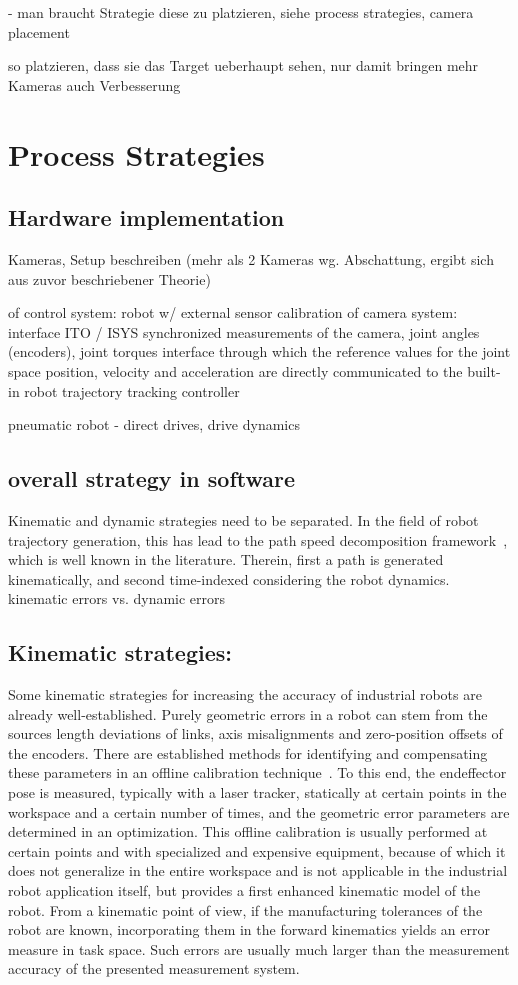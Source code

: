 \documentclass[5p,times,procedia]{elsarticle}
\begin{document}
- man braucht Strategie diese zu platzieren, siehe process strategies, camera placement 

so platzieren, dass sie das Target ueberhaupt sehen, nur damit bringen mehr Kameras auch Verbesserung

\section{Process Strategies}
\subsection{Hardware implementation} 

Kameras, Setup beschreiben (mehr als 2 Kameras wg. Abschattung, ergibt sich aus zuvor beschriebener Theorie)


of control system: robot w/ external sensor
calibration of camera system: interface ITO / ISYS
synchronized measurements of the camera, joint angles (encoders), joint torques 
interface through which the reference values for the joint space position, velocity and acceleration are directly communicated to the built-in robot trajectory tracking controller

pneumatic robot - direct drives, drive dynamics 

\subsection{overall strategy in software}
Kinematic and dynamic strategies need to be separated. 
In the field of robot trajectory generation, this has lead to the path speed decomposition framework~\cite{Choset05}, which is well known in the literature. 
Therein, first a path is generated kinematically, and second time-indexed considering the robot dynamics. 
kinematic errors vs. dynamic errors 

\subsection{Kinematic strategies:}
Some kinematic strategies for increasing the accuracy of industrial robots are already well-established.
Purely geometric errors in a robot can stem from the sources length deviations of links, axis misalignments and zero-position offsets of the encoders.
There are established methods for identifying and compensating these parameters in an offline calibration technique~\cite{Wiest01}.
To this end, the endeffector pose is measured, typically with a laser tracker, statically at certain points in the workspace and a certain number of times, and the geometric error parameters are determined in an optimization.
This offline calibration is usually performed at certain points and with specialized and expensive equipment, because of which it does not generalize in the entire workspace and is not applicable in the industrial robot application itself, but provides a first enhanced kinematic model of the robot.
From a kinematic point of view, if the manufacturing tolerances of the robot are known, incorporating them in the forward kinematics yields an error measure in task space. Such errors are usually much larger than the measurement accuracy of the presented measurement system.
\end{document}
